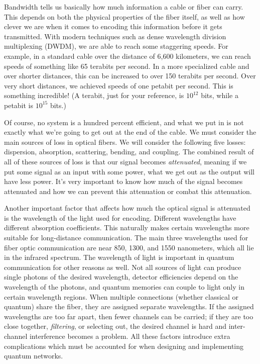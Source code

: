 Bandwidth tells us basically how much information a cable or fiber can carry.
This depends on both the physical properties of the fiber itself, as well as how clever we are when it comes to encoding this information before it gets transmitted. With modern techniques such as dense wavelength division multiplexing (DWDM), we are able to reach some staggering speeds. For example, in a standard cable over the distance of 6,600 kilometers, we can reach speeds of something like 65 terabits per second. In a more specialized cable and over shorter distances, this can be increased to over 150 terabits per second. Over very short distances, we achieved speeds of one petabit per second. This is something incredible! (A terabit, just for your reference, is $10^{12}$ bits, while a petabit is $10^{15}$ bits.)

Of course, no system is a hundred percent efficient, and what we put in is not exactly what we're going to get out at the end of the cable. We must consider the main sources of loss in optical fibers. We will consider the following five losses: dispersion, absorption, scattering, bending, and coupling. The combined result of all of these sources of loss is that our signal becomes \emph{attenuated}, meaning if we put some signal as an input with some power, what we get out as the output will have less power. It's very important to know how much of the signal becomes attenuated and how we can prevent this attenuation or combat this attenuation.

Another important factor that affects how much the optical signal is attenuated is the wavelength of the light used for encoding.
Different wavelengths have different absorption coefficients.
This naturally makes certain wavelengths more suitable for long-distance communication.
The main three wavelengths used for fiber optic communication are near 850, 1300, and 1550 nanometers, which all lie in the infrared spectrum.
The wavelength of light is important in quantum communication for other reasons as well.
Not all sources of light can produce single photons of the desired wavelength, detector efficiencies depend on the wavelength of the photons, and quantum memories can couple to light only in certain wavelength regions. When multiple connections (whether classical or quantum) share the fiber, they are assigned separate wavelengths. If the assigned wavelengths are too far apart, then fewer channels can be carried; if they are too close together, \emph{filtering}, or selecting out, the desired channel is hard and inter-channel interference becomes a problem. 
All these factors introduce extra complications which must be accounted for when designing and implementing quantum networks.

